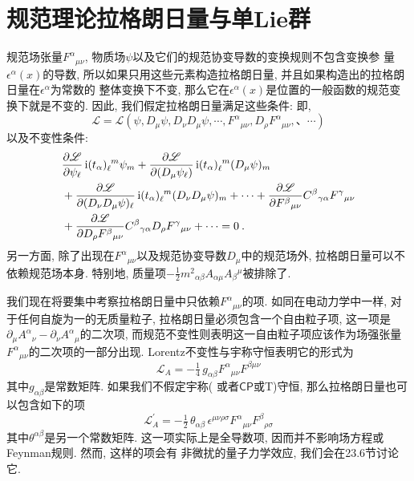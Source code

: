 \section{规范理论拉格朗日量与单Lie群}

规范场张量$F^{\alpha }{}_{\mu \nu }$, 物质场$\psi $以及它们的规范协变导数的变换规则不包含变换参%
量$\epsilon ^{\alpha }(x)$的导数, 所以如果只用这些元素构造拉格朗日量, 并且如果构造出的拉格朗日量在$\epsilon ^{\alpha }$为常数的%
整体变换下不变, 那么它在$\epsilon ^{\alpha }(x)$是位置的一般函数的规范变换下就是不变的. 因此,
我们假定拉格朗日量满足这些条件: 即,%
\begin{equation}
\mathscr{L}=\mathscr{L}(\psi ,D_{\mu }\psi ,D_{\nu }D_{\mu }\psi ,\cdots
,F^{\alpha }{}_{\mu \nu },D_{\rho }F^{\alpha }{}_{\mu \nu },、\cdots)  \label{15.2.1}
\end{equation}%
以及不变性条件:\begin{align}
&\frac{\partial \mathscr{L}}{\partial \psi _{\ell }}\,\mi(t_{\alpha })_{\ell }^{%
\phantom{\ell}m}\psi _{m}+\frac{\partial \mathscr{L}}{\partial (D_{\mu }\psi
_{\ell })}\,\mi(t_{\alpha })_{\ell }^{\phantom{\ell}m}(D_{\mu }\psi )_{m}
\nonumber \\
&+\frac{\partial \mathscr{L}}{\partial (D_{\nu }D_{\mu }\psi )_{\ell }}%
\,\mi(t_{\alpha })_{\ell }^{\phantom{\ell}m}(D_{\nu }D_{\mu }\psi )_{m}+\cdots +%
\frac{\partial \mathscr{L}}{\partial F^{\beta }{}_{\mu \nu }}C^{\beta}{}_{\gamma%
\alpha}F^{\gamma }{}_{\mu \nu }  \nonumber \\
&+\frac{\partial \mathscr{L}}{\partial D_{\rho }F^{\beta }{}_{\mu \nu }}%
C^{\beta}{}_{\gamma\alpha}D_{\rho }F^{\gamma }{}_{\mu \nu }+\cdots  =0%
\:.   \label{15.2.2}
\end{align}%
另一方面, 除了出现在$%
F^{\alpha }{}_{\mu \nu }$以及规范协变导数$D_{\mu }$中的规范场外, 拉格朗日量可以不依赖规范场本身. 特别地,
质量项$-\frac{1}{2}m^{2}{}_{\alpha\beta}A_{\alpha \mu}A_{\beta }{}^{\mu}$被排除了.

我们现在将要集中考察拉格朗日量中只依赖$F^{\alpha }{}_{\mu \nu }$的项. 如同在电动力学中一样, 对于任何自旋为一的无质量粒子, 
拉格朗日量必须包含一个自由粒子项, 这一项是$\partial _{\mu }A^{\alpha}{}_{\nu }-\partial _{\nu }A^{\alpha }{}_{\mu }$的二次项, 
而规范不变性则表明这一自由粒子项应该作为场强张量$F^{\alpha }{}_{\mu\nu}$的二次项的一部分出现. Lorentz不变性与宇称守恒表明它的形式为
\begin{equation}
\mathscr{L}_{A} = -\tfrac{1}{4}\, g_{\alpha\beta} F^{\alpha}{}_{\mu\nu} F^{\beta\mu\nu} \label{15.2.3}
\end{equation}
其中$g_{\alpha \beta }$是常数矩阵.
如果我们不假定宇称(%
或者$\mathsf{CP}$或\textsf{T})守恒, 那么拉格朗日量也可以包含如下的项%
\[
\mathscr{L}^{\prime}_{A} = -\tfrac{1}{2}\, \theta_{\alpha\beta} \,\epsilon^{\mu\nu\rho\sigma} F^{\alpha}{}_{\mu\nu} F^{\beta}{}_{\rho\sigma}
\]%
其中$\theta ^{\alpha \beta }$是另一个常数矩阵. 这一项实际上是全导数项, 因而并不影响场方程或Feynman规则. 然而, 这样的项会有%
非微扰的量子力学效应, 我们会在23.6节讨论它.

